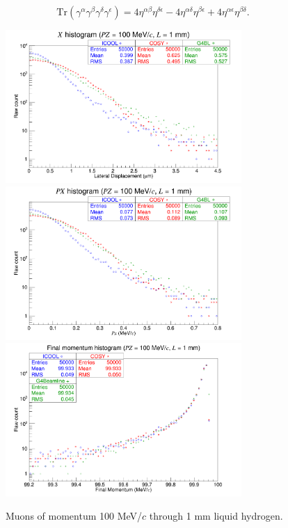 \begin{equation}\label{eqn:griffithsRule13}
\text{Tr}(\gamma^\alpha\gamma^\beta\gamma^\delta\gamma^\epsilon)=4\eta^{\alpha\beta}\eta^{\delta\epsilon}-4\eta^{\alpha\delta}\eta^{\beta\epsilon}+4\eta^{\alpha\epsilon}\eta^{\beta\delta}.
\end{equation}
\label{apx:benchmark}
\begin{figure}[!htb]
  \centering
    \includegraphics[width=0.8\textwidth]{Validation/LH/X.100.1.png} 
    \includegraphics[width=0.8\textwidth]{Validation/LH/PX.100.1.png} 
    \includegraphics[width=0.8\textwidth]{Validation/LH/strag.100.1.png} 
  \caption{Muons of momentum 100 MeV/$c$ through 1 mm liquid hydrogen.}
  \label{fig:100.1}
\end{figure}

